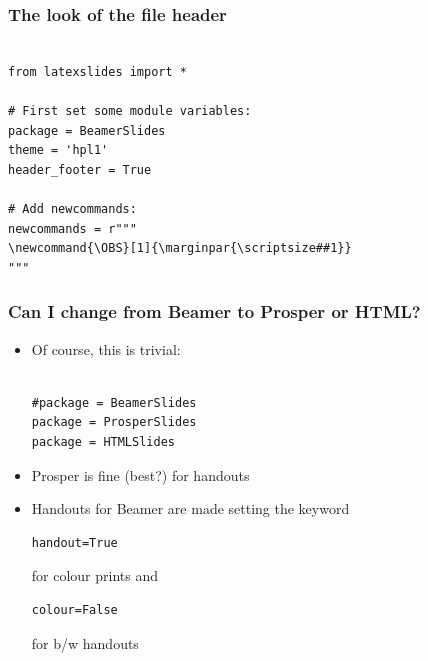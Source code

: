 \documentclass{beamer}
\newcommand{\OBS}[1]{\marginpar{\scriptsize##1}}
\begin{document}
\begin{frame}[fragile]
\frametitle{The look of the file header}

\begin{block}

\begin{Verbatim}[fontsize=\footnotesize,tabsize=4,baselinestretch=0.85,fontfamily=tt,xleftmargin=7mm]

from latexslides import *

# First set some module variables:
package = BeamerSlides
theme = 'hpl1'
header_footer = True

# Add newcommands:
newcommands = r"""
\newcommand{\OBS}[1]{\marginpar{\scriptsize##1}}
"""
\end{Verbatim}


\end{block}

\end{frame}

\begin{frame}[fragile]
\frametitle{Can I change from Beamer to Prosper or HTML?}

\begin{block}

\begin{itemize}
\item Of course, this is trivial:\begin{Verbatim}[fontsize=\footnotesize,tabsize=4,baselinestretch=0.85,fontfamily=tt,xleftmargin=7mm]

#package = BeamerSlides
package = ProsperSlides
package = HTMLSlides
\end{Verbatim}

\item Prosper is fine (best?) for handouts
\item Handouts for Beamer are made setting the keyword \begin{Verbatim}[fontsize=\footnotesize,tabsize=4,baselinestretch=0.85,fontfamily=tt,xleftmargin=7mm]
handout=True
\end{Verbatim}
for colour prints and \begin{Verbatim}[fontsize=\footnotesize,tabsize=4,baselinestretch=0.85,fontfamily=tt,xleftmargin=7mm]
colour=False
\end{Verbatim}
for b/w handouts
\end{itemize}

\end{block}

\end{frame}
\end{document}
